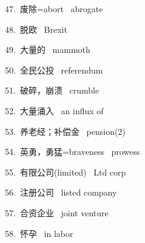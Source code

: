 \documentclass[a4paper, 12pt]{article}
\begin{document}
\begin{multicols}{2}
\begin{flushleft}
47.\ 废除=abort \ abrogate
\end{flushleft}

\begin{flushleft}
48.\ 脱欧 \ Brexit
\end{flushleft}
\end{multicols}

\begin{multicols}{2}
\begin{flushleft}
49.\ 大量的 \ mammoth
\end{flushleft}

\begin{flushleft}
50.\ 全民公投 \ referendum
\end{flushleft}
\end{multicols}

\begin{multicols}{2}
\begin{flushleft}
51.\ 破碎，崩溃 \ crumble
\end{flushleft}

\begin{flushleft}
52.\ 大量涌入 \ an influx of
\end{flushleft}
\end{multicols}

\begin{multicols}{2}
\begin{flushleft}
53.\ 养老经；补偿金 \ pension(2)
\end{flushleft}

\begin{flushleft}
54.\ 英勇，勇猛=braveness \ prowess
\end{flushleft}
\end{multicols}

\begin{multicols}{2}
\begin{flushleft}
55.\ 有限公司(limited) \ Ltd corp
\end{flushleft}

\begin{flushleft}
56.\ 注册公司 \ listed company
\end{flushleft}
\end{multicols}

\begin{multicols}{2}
\begin{flushleft}
57.\ 合资企业 \ joint venture
\end{flushleft}

\begin{flushleft}
58.\ 怀孕 \ in labor
\end{flushleft}
\end{multicols}
\end{document}
